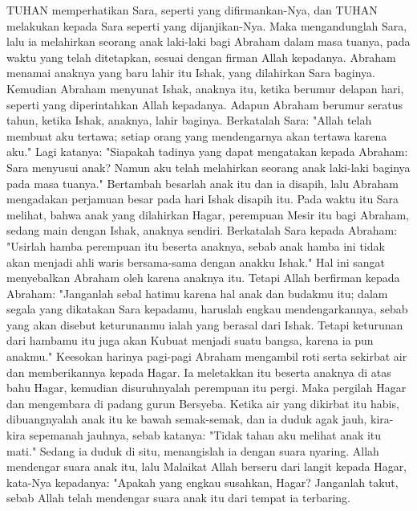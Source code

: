\begin{biblechapter} %
 TUHAN memperhatikan Sara, seperti yang difirmankan-Nya, dan TUHAN melakukan kepada Sara seperti yang dijanjikan-Nya.
\verse Maka mengandunglah Sara, lalu ia melahirkan seorang anak laki-laki bagi Abraham dalam masa tuanya, pada waktu yang telah ditetapkan, sesuai dengan firman Allah kepadanya.
\verse Abraham menamai anaknya yang baru lahir itu Ishak, yang dilahirkan Sara baginya.
\verse Kemudian Abraham menyunat Ishak, anaknya itu, ketika berumur delapan hari, seperti yang diperintahkan Allah kepadanya.
\verse Adapun Abraham berumur seratus tahun, ketika Ishak, anaknya, lahir baginya.
\verse Berkatalah Sara: "Allah telah membuat aku tertawa; setiap orang yang mendengarnya akan tertawa karena aku."
\verse Lagi katanya: "Siapakah tadinya yang dapat mengatakan kepada Abraham: Sara menyusui anak? Namun aku telah melahirkan seorang anak laki-laki baginya pada masa tuanya."
 Bertambah besarlah anak itu dan ia disapih, lalu Abraham mengadakan perjamuan besar pada hari Ishak disapih itu.
\verse Pada waktu itu Sara melihat, bahwa anak yang dilahirkan Hagar, perempuan Mesir itu bagi Abraham, sedang main dengan Ishak, anaknya sendiri.
\verse Berkatalah Sara kepada Abraham: "Usirlah hamba perempuan itu beserta anaknya, sebab anak hamba ini tidak akan menjadi ahli waris bersama-sama dengan anakku Ishak."
\verse Hal ini sangat menyebalkan Abraham oleh karena anaknya itu.
\verse Tetapi Allah berfirman kepada Abraham: "Janganlah sebal hatimu karena hal anak dan budakmu itu; dalam segala yang dikatakan Sara kepadamu, haruslah engkau mendengarkannya, sebab yang akan disebut keturunanmu ialah yang berasal dari Ishak.
\verse Tetapi keturunan dari hambamu itu juga akan Kubuat menjadi suatu bangsa, karena ia pun anakmu."
\verse Keesokan harinya pagi-pagi Abraham mengambil roti serta sekirbat air dan memberikannya kepada Hagar. Ia meletakkan itu beserta anaknya di atas bahu Hagar, kemudian disuruhnyalah perempuan itu pergi. Maka pergilah Hagar dan mengembara di padang gurun Bersyeba.
\verse Ketika air yang dikirbat itu habis, dibuangnyalah anak itu ke bawah semak-semak,
\verse dan ia duduk agak jauh, kira-kira sepemanah jauhnya, sebab katanya: "Tidak tahan aku melihat anak itu mati." Sedang ia duduk di situ, menangislah ia dengan suara nyaring.
\verse Allah mendengar suara anak itu, lalu Malaikat Allah berseru dari langit kepada Hagar, kata-Nya kepadanya: "Apakah yang engkau susahkan, Hagar? Janganlah takut, sebab Allah telah mendengar suara anak itu dari tempat ia terbaring.

\end{biblechapter}
